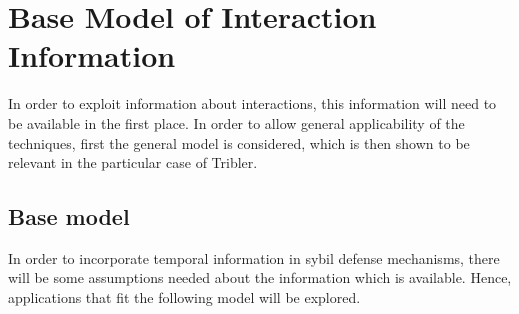 \documentclass[a4paper,11pt]{book}
\newcommand\musthave[1]{\textcolor{red}{TODO: #1}}
\newcommand\nicetohave[1]{\textcolor{orange}{TODO: #1}}
\theoremstyle{definition}
\begin{document}

\chapter{Base Model of Interaction Information}
\label{chap:base_model}

In order to exploit information about interactions, this information will need to be
available in the first place. In order to allow general applicability of the
techniques, first the general model is considered, which is then shown to be
relevant in the particular case of Tribler.


\section{Base model}

In order to incorporate temporal information in sybil defense mechanisms,
there will be some assumptions needed about the information which is available.
Hence, applications that fit the following model will be explored.
\end{document}
